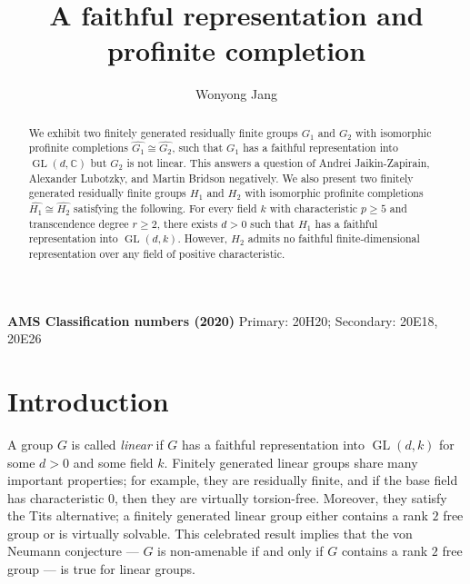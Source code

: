 \documentclass[11pt]{amsart}
\theoremstyle{definition}
\DeclareMathOperator{\GL}{GL}
\newcommand{\CC}{\mathbb{C}}
\begin{document}
\title{A faithful representation and profinite completion}

\author{Wonyong Jang}
\address{Department of Mathematical Sciences, Seoul National University, 1 Gwanak-ro, Gwanak-gu, Seoul 08826, Republic of Korea}

\begin{abstract}
We exhibit two finitely generated residually finite groups $G_1$ and $G_2$ with isomorphic profinite completions $\widehat{G_1} \cong \widehat{G_2}$, such that $G_1$ has a faithful representation into $\GL(d,\CC)$ but $G_2$ is not linear.
This answers a question of Andrei Jaikin-Zapirain, Alexander Lubotzky, and Martin Bridson negatively.
We also present two finitely generated residually finite groups $H_1$ and $H_2$ with isomorphic profinite completions $\widehat{H_1} \cong \widehat{H_2}$ satisfying the following.
For every field $k$ with characteristic $p \geq 5$ and transcendence degree $r \geq 2$,
there exists $d>0$ such that $H_1$ has a faithful representation into $\GL(d,k)$. 
However, $H_2$ admits no faithful finite-dimensional representation over any field of positive characteristic.
\end{abstract}

\maketitle

\vspace{0.6cm}
\noindent \textbf{AMS Classification numbers (2020)} Primary: 20H20; Secondary: 20E18, 20E26

\vspace{0.6cm}

\section{Introduction}\label{sec:intro}

 A group $G$ is called \emph{linear} if $G$ has a faithful representation into $\GL(d,k)$ for some $d>0$ and some field $k$.
 Finitely generated linear groups share many important properties; for example, they are residually finite, and if the base field has characteristic $0$, then they are virtually torsion-free.
 Moreover, they satisfy the Tits alternative; a finitely generated linear group either contains a rank $2$ free group or is virtually solvable.
 This celebrated result implies that the von Neumann conjecture --- $G$ is non-amenable if and only if $G$ contains a rank $2$ free group --- is true for linear groups.
\end{document}
